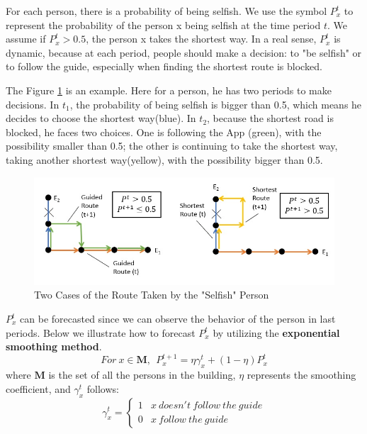 \documentclass[a4paper,12pt]{article}
\begin{document}
For each person, there is a probability of being selfish. We use the symbol $P^{t}_x$ to represent the probability of the person x being selfish at the time period $t$. We assume if $P^{t}_x>0.5$, the person x takes the shortest way. In a real sense, $P^{t}_x$ is dynamic, because at each period, people should make a decision: to "be selfish" or to follow the guide, especially when finding the shortest route is blocked. 

The Figure \ref{fig4-2} is an example. Here for a person, he has two periods to make decisions. In $t_1$, the probability of being selfish is bigger than 0.5, which means he decides to choose the shortest way(blue). In $t_2$, because the shortest road is blocked, he faces two choices. One is following the App (green), with the possibility smaller than 0.5; the other is continuing to take the shortest way, taking another shortest way(yellow), with the possibility bigger than 0.5.

\begin{figure} [H]
\centering
\includegraphics[width=15cm]{123.jpg}
\caption{Two Cases of the Route Taken by the "Selfish" Person}
\label{fig4-2}
\end{figure}

$P^{t}_x$ can be forecasted since we can observe the behavior of the person in last periods. Below we illustrate how to forecast $P^{t}_x$ by utilizing the \textbf{exponential smoothing method}.
\begin{equation}
\label{equ6}
For\ x\in  \bm{M}, \ \ 
P^{t+1}_x=\eta \gamma ^t_x+(1-\eta )P^t_x
\end{equation}
where $\bm{M}$ is the set of all the persons in the building, $\eta$ represents the smoothing coefficient, and $\gamma ^t_x$ follows:
\begin{equation}
\label{equ7}
\gamma^t_x=\left\{\begin{matrix}
1 & x\ doesn't\ follow\ the\ guide\\ 
0 & x\ follow\ the\ guide
\end{matrix}\right.
\end{equation}
\end{document}
